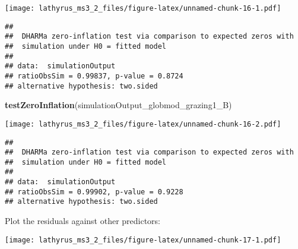 \documentclass[
]{article}
\newenvironment{Shaded}{\begin{snugshade}}{\end{snugshade}}
\newcommand{\DataTypeTok}[1]{\textcolor[rgb]{0.13,0.29,0.53}{#1}}
\newcommand{\DecValTok}[1]{\textcolor[rgb]{0.00,0.00,0.81}{#1}}
\newcommand{\KeywordTok}[1]{\textcolor[rgb]{0.13,0.29,0.53}{\textbf{#1}}}
\newcommand{\NormalTok}[1]{#1}
\newcommand{\OperatorTok}[1]{\textcolor[rgb]{0.81,0.36,0.00}{\textbf{#1}}}
\begin{document}
\texttt{[image: lathyrus\_ms3\_2\_files/figure-latex/unnamed-chunk-16-1.pdf]}

\begin{verbatim}
## 
##  DHARMa zero-inflation test via comparison to expected zeros with
##  simulation under H0 = fitted model
## 
## data:  simulationOutput
## ratioObsSim = 0.99837, p-value = 0.8724
## alternative hypothesis: two.sided
\end{verbatim}

\begin{Shaded}
\begin{Highlighting}[]
\KeywordTok{testZeroInflation}\NormalTok{(simulationOutput_globmod_grazing1_B)}
\end{Highlighting}
\end{Shaded}

\texttt{[image: lathyrus\_ms3\_2\_files/figure-latex/unnamed-chunk-16-2.pdf]}

\begin{verbatim}
## 
##  DHARMa zero-inflation test via comparison to expected zeros with
##  simulation under H0 = fitted model
## 
## data:  simulationOutput
## ratioObsSim = 0.99902, p-value = 0.9228
## alternative hypothesis: two.sided
\end{verbatim}

Plot the residuals against other predictors:

\begin{Shaded}
\end{Shaded}

\texttt{[image: lathyrus\_ms3\_2\_files/figure-latex/unnamed-chunk-17-1.pdf]}
\end{document}
